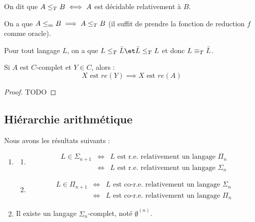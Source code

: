\begin{definition}
	On dit que $A \leq_T B \iff A$ est décidable relativement à $B$.
\end{definition}

\begin{remarque}
	On a que $A \leq_m B \implies A \leq_T B$ (il suffit de prendre la fonction de reduction $f$ comme oracle).
\end{remarque}

\begin{remarque}
	Pour tout langage $L$, on a que $L \leqt \bar L \et \bar L \leqt L$ et donc $L \equiv_T \bar L$.
\end{remarque}


\begin{lemma}
	Si $A$ est $C$-complet et $Y \in C$, alors :
	$$X \text{ est } re(Y) \implies X \text{ est } re(A)$$
\end{lemma}

\begin{proof}
	TODO
\end{proof}


\subsection{Hiérarchie arithmétique}

\begin{theorem}[de Post]
	Nous avons les résultats suivants :
	\begin{enumerate}
		\item \label{thm:post-1}
		      \begin{enumerate}
			      \item \label{thm:post-1a}
			            \begin{eqnarray*}
				            L \in \Sigma_{n+1} &\iff& L \text{ est r.e. relativement  un langage }  \Pi_n  \\
				            &\iff& L \text{ est r.e. relativement  un langage }  \Sigma_{n}
			            \end{eqnarray*}

			      \item
			            \begin{eqnarray*}
				            L \in \Pi_{n+1} &\iff& L \text{ est co-r.e. relativement  un langage }  \Sigma_n  \\
				            &\iff& L \text{ est co-r.e. relativement  un langage }  \Pi_n
			            \end{eqnarray*}
		      \end{enumerate}

		\item Il existe un langage $\Sigma_n$-complet, noté $\emptyset^{(n)}$. \label{thm:post-2}
	\end{enumerate}
\end{theorem}


